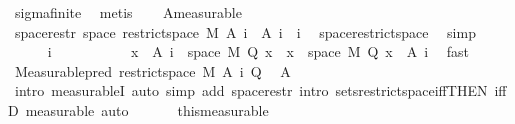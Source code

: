 \begin{isabellebody}
\ sigma{\isacharunderscore}{\kern0pt}finite\ \isamarkupfalse%
\ metis\isanewline
\ \ \isamarkupfalse%
\ A{\isacharparenleft}{\kern0pt}{}{\isacharparenright}{\kern0pt}{\isacharbrackleft}{\kern0pt}measurable{\isacharbrackright}{\kern0pt}\isanewline
\ \ \isamarkupfalse%
\ space{\isacharunderscore}{\kern0pt}restr{\isacharcolon}{\kern0pt}\ {\isachardoublequoteopen}space\ {\isacharparenleft}{\kern0pt}restrict{\isacharunderscore}{\kern0pt}space\ M\ {\isacharparenleft}{\kern0pt}A\ i{\isacharparenright}{\kern0pt}{\isacharparenright}{\kern0pt}\ {\isacharequal}{\kern0pt}\ A\ i{\isachardoublequoteclose}\ \ i\ \isamarkupfalse%
\ space{\isacharunderscore}{\kern0pt}restrict{\isacharunderscore}{\kern0pt}space\ \isamarkupfalse%
\ simp\isanewline
\ \ \isacommand{{\isacharbraceleft}{\kern0pt}}\isamarkupfalse%
\isanewline
\ \ \ \ \isamarkupfalse%
\ i\ \ \ \ \isanewline
\ \ \ \ \isamarkupfalse%
\ {\isacharasterisk}{\kern0pt}{\isacharcolon}{\kern0pt}\ {\isachardoublequoteopen}{\isacharbraceleft}{\kern0pt}x\ {\isasymin}\ A\ i\ {\isasyminter}\ space\ M{\isachardot}{\kern0pt}\ Q\ x{\isacharbraceright}{\kern0pt}\ {\isacharequal}{\kern0pt}\ {\isacharbraceleft}{\kern0pt}x\ {\isasymin}\ space\ M{\isachardot}{\kern0pt}\ Q\ x{\isacharbraceright}{\kern0pt}\ {\isasyminter}\ {\isacharparenleft}{\kern0pt}A\ i{\isacharparenright}{\kern0pt}{\isachardoublequoteclose}\ \isamarkupfalse%
\ fast\isanewline
\ \ \ \ \isamarkupfalse%
\ {\isachardoublequoteopen}Measurable{\isachardot}{\kern0pt}pred\ {\isacharparenleft}{\kern0pt}restrict{\isacharunderscore}{\kern0pt}space\ M\ {\isacharparenleft}{\kern0pt}A\ i{\isacharparenright}{\kern0pt}{\isacharparenright}{\kern0pt}\ Q{\isachardoublequoteclose}\ \isamarkupfalse%
\ A\ \isamarkupfalse%
\ {\isacharparenleft}{\kern0pt}intro\ measurableI{\isacharcomma}{\kern0pt}\ auto\ simp\ add{\isacharcolon}{\kern0pt}\ space{\isacharunderscore}{\kern0pt}restr\ intro{\isacharbang}{\kern0pt}{\isacharcolon}{\kern0pt}\ sets{\isacharunderscore}{\kern0pt}restrict{\isacharunderscore}{\kern0pt}space{\isacharunderscore}{\kern0pt}iff{\isacharbrackleft}{\kern0pt}THEN\ iffD{}{\isacharbrackright}{\kern0pt}{\isacharcomma}{\kern0pt}\ measurable{\isacharcomma}{\kern0pt}\ auto{\isacharparenright}{\kern0pt}\isanewline
\ \ \isacommand{{\isacharbraceright}{\kern0pt}}\isamarkupfalse%
\isanewline
\ \ \isamarkupfalse%
\ this{\isacharbrackleft}{\kern0pt}measurable{\isacharbrackright}{\kern0pt}\isanewline

\end{isabellebody}
